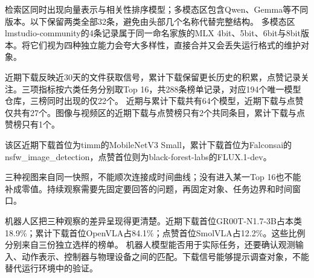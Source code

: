 检索区同时出现向量表示与相关性排序模型；多模态区包含Qwen、Gemma等不同版本。以下保留两类全部32条，避免由头部几个名称代替完整结构。
多模态区lmstudio-community的4条记录属于同一命名家族的MLX 4bit、5bit、6bit与8bit版本。将它们视为四种独立能力会夸大多样性，直接合并又会丢失运行格式的维护对象。

近期下载反映近30天的文件获取信号，累计下载保留更长历史的积累，点赞记录关注。三项指标按六类任务分别取Top 16，共288条榜单记录，对应194个唯一模型仓库，三榜同时出现的仅22个。
近期与累计下载共有64个模型，近期下载与点赞仅共有27个。图像与视频区的近期下载与点赞榜只有2个共同条目，累计下载与点赞榜只有1个。

该区近期下载首位为timm的MobileNetV3 Small，累计下载首位为Falconsai的nsfw\_image\_detection，点赞首位则为black-forest-labs的FLUX.1-dev。

三种视图来自同一快照，不能顺次连接成时间曲线；没有进入某一Top 16也不能补成零值。持续观察需要先固定要回答的问题，再固定对象、任务边界和时间窗口。

机器人区把三种观察的差异呈现得更清楚。近期下载首位GR00T-N1.7-3B占本类18.9\%；累计下载首位OpenVLA占84.1\%；点赞首位SmolVLA占12.2\%。这些比例分别来自三份独立选样的榜单。
机器人模型能否用于实际任务，还要确认观测输入、动作表示、控制器与物理设备之间的匹配。下载信号能够提示调查对象，不能替代运行环境中的验证。

